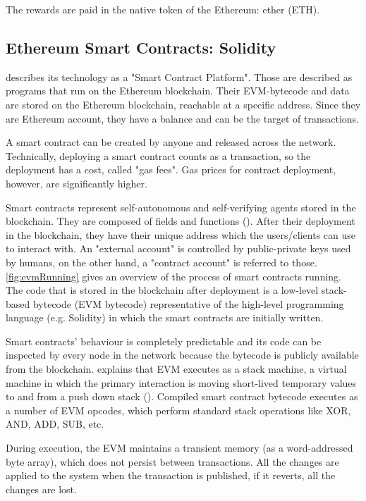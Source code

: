 The rewards are paid in the native token of the Ethereum: ether (ETH). 

\subsection{Ethereum Smart Contracts: Solidity}
\citet{EthDocs} describes its technology as a "Smart Contract Platform".
Those are described as programs that run on the Ethereum blockchain. 
Their EVM-bytecode and data are stored on the Ethereum blockchain, reachable at a specific address.
Since they are Ethereum account, they have a balance and can be the target of transactions. 

A smart contract can be created by anyone and released across the network.
Technically, deploying a smart contract counts as a transaction, so the deployment has a cost, called "gas fees".
Gas prices for contract deployment, however, are significantly higher. 

Smart contracts represent self-autonomous and self-verifying agents stored in the blockchain. 
They are composed of fields and functions (\cite{SmartContracts}). 
After their deployment in the blockchain, they have their unique address which the users/clients can use to interact with.
An "external account" is controlled by public-private keys used by humans, on the other hand, a "contract account" is referred to those.
\autoref{fig:evmRunning} gives an overview of the process of smart contracts running. 
The code that is stored in the blockchain after deployment is a low-level stack-based bytecode
(EVM bytecode) representative of the high-level programming language (e.g. Solidity) in which the smart contracts are initially written. 

Smart contracts' behaviour is completely predictable and its code can be inspected by every
node in the network because the bytecode is publicly available from the blockchain.
\citet{EthDocs} explains that EVM executes as a stack machine, a virtual machine in which the primary interaction is moving 
short-lived temporary values to and from a push down stack (\cite{stack}).
Compiled smart contract bytecode executes as a number of EVM opcodes, 
which perform standard stack operations like XOR, AND, ADD, SUB, etc. 

During execution, the EVM maintains a transient memory (as a word-addressed byte array), which does not persist between transactions. 
All the changes are applied to the system when the transaction is published, if it reverts, all the changes are lost.



